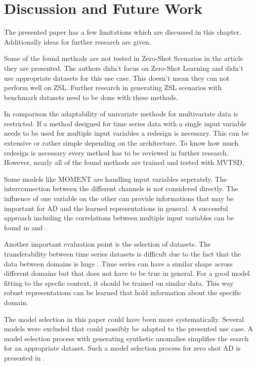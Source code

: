 \section{Discussion and Future Work}\label{discussion}
The presented paper has a few limitations which are discussed in this chapter. Additionally ideas for further research are given.

Some of the found methods are not tested in Zero-Shot Scenarios in the article they are presented. The authors didn't focus on Zero-Shot Learning and didn't use appropriate datasets for this use case.  This doesn't mean they can not perform well on ZSL. Further research in generating ZSL scenarios with benchmark datasets need to be done with these methods.

In comparison the adaptability of univariate methods for multivariate data is restricted. If a method designed for time series data with a single input variable needs to be used for multiple input variables a redesign is necessary. This can be extensive or rather simple depending on the architecture. To know how much redesign is necessary every method has to be reviewed in further research. However, nearly all of the found methods are trained and tested with MVTSD.

Some models like MOMENT are handling input variables seperately. The interconnection between the different channels is not considered directly. The influence of one variable on the other can provide informations that may be important for AD and the learned representations in general. A successful approach including the correlations between multiple input variables can be found in \cite{pranavan_contrastive_2022} and \cite{han_learning_2022}.

Another important evaluation point is the selection of datasets. The transferability between time series datasets is difficult due to the fact that the data between domains is huge \cite{ma_survey_2023}. Time series can have a similar shape across different domains but that does not have to be true in general. For a good model fitting to the specfic context, it should be trained on similar data. This way robust representations can be learned that hold information about the specific domain.


The model selection in this paper could have been more systematically. Several models were excluded that could possibly be adapted to the presented use case. A model selection process with generating synthetic anomalies simplifies the search for an appropriate dataset. Such a model selection process for zero shot AD is presented in \cite{fung_model_2024}.

